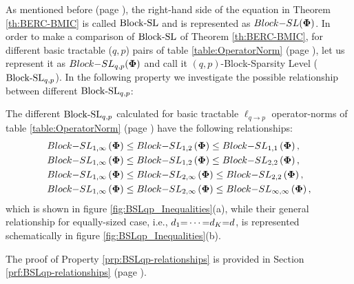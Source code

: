 As mentioned before (page \pageref{txt:BlockSL}), the right-hand side of the equation in Theorem \ref{th:BERC-BMIC} is called $\mathrm{Block\text{{-}}SL}$ and is represented as $Block{-}SL(\boldsymbol{\Phi})$.
In order to make a comparison of $\mathrm{Block\text{{-}}SL}$ of Theorem \ref{th:BERC-BMIC}, for different basic tractable ($q,p$) pairs of table \ref{table:OperatorNorm} (page \pageref{table:OperatorNorm}), let us represent it as $Block{-}SL_{q,p}(\boldsymbol{\Phi})$ and call it $({q,p})$-Block-Sparsity Level ($\mathrm{Block\text{{-}}SL}_{q,p}$).
In the following property we investigate the possible relationship between different $\mathrm{Block\text{{-}}SL}_{q,p}$:
\begin{property}
\label{prp:BSLqp-relationships}
The different $\mathrm{Block\text{{-}}SL}_{q,p}$ calculated for basic tractable $\ell_{q {\to} p}$ operator-norms of table \ref{table:OperatorNorm} (page \pageref{table:OperatorNorm}) have the following relationships:
\begin{equation*}
\begin{aligned}
Block{-}SL_{1,\infty}\left( \boldsymbol{\Phi} \right) &\leq Block{-}SL_{1,2}\left( \boldsymbol{\Phi} \right) \leq Block{-}SL_{1,1}\left( \boldsymbol{\Phi} \right), \\
Block{-}SL_{1,\infty}\left( \boldsymbol{\Phi} \right) &\leq Block{-}SL_{1,2}\left( \boldsymbol{\Phi} \right) \leq Block{-}SL_{2,2}\left( \boldsymbol{\Phi} \right), \\
Block{-}SL_{1,\infty}\left( \boldsymbol{\Phi} \right) &\leq Block{-}SL_{2,\infty}\left( \boldsymbol{\Phi} \right) \leq Block{-}SL_{2,2}\left( \boldsymbol{\Phi} \right), \\
Block{-}SL_{1,\infty}\left( \boldsymbol{\Phi} \right) &\leq Block{-}SL_{2,\infty}\left( \boldsymbol{\Phi} \right) \leq Block{-}SL_{\infty,\infty}\left( \boldsymbol{\Phi} \right),
\end{aligned}
\end{equation*}
which is shown in figure \ref{fig:BSLqp_Inequalities}(a), while their general relationship for equally-sized case, i.e., $d_1 {=} \cdots {=} d_K {=} d$, is represented schematically in figure \ref{fig:BSLqp_Inequalities}(b). 

\end{property}
The proof of Property \ref{prp:BSLqp-relationships} is provided in Section \ref{prf:BSLqp-relationships} (page \pageref{prf:BSLqp-relationships}).